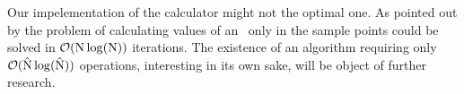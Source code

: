 Our impelementation of the \KS calculator might not the optimal one. As pointed out by \citet*{Jon} the problem of calculating values of an \ecdf\, only in the sample points could be solved in $\mathcal{O}(\mathrm{N} \log( \mathrm{N} ))$ iterations. The existence of an algorithm requiring only $\mathcal{O}(\hat{\mathrm{N}} \log( \hat{\mathrm{N}}  ))$ operations, interesting in its own sake, will be object of further research.